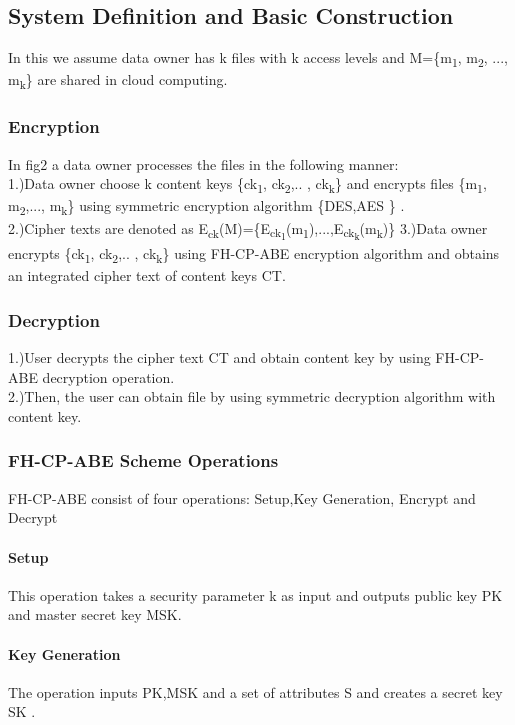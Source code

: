 \documentclass[a4paper,12pt]{article}
\begin{document}
\subsection{System Definition and Basic Construction}
In this we assume data owner has k files with k access levels and M=\{m\textsubscript{1}, m\textsubscript{2}, ..., m\textsubscript{k}\} are shared in cloud computing.\\ 
\subsubsection{Encryption}
In fig2 a data owner processes the files in the following manner:\\ 
1.)Data owner choose k content keys \{ck\textsubscript{1}, ck\textsubscript{2},.. , ck\textsubscript{k}\} and encrypts files \{m\textsubscript{1}, m\textsubscript{2},..., m\textsubscript{k}\} using symmetric encryption algorithm \{DES,AES \} .\\
2.)Cipher texts are denoted as E\textsubscript{ck}(M)=\{E\textsubscript{ck\textsubscript{1}}(m\textsubscript{1}),...,E\textsubscript{ck\textsubscript{k}}(m\textsubscript{k})\}
3.)Data owner encrypts \{ck\textsubscript{1}, ck\textsubscript{2},.. , ck\textsubscript{k}\} using FH-CP-ABE encryption algorithm and obtains an integrated cipher text of content keys CT.
\subsubsection{Decryption}
1.)User decrypts the cipher text CT and obtain content key by using FH-CP-ABE decryption operation.\\
2.)Then, the user can obtain file by using symmetric decryption algorithm with content key.

\subsubsection{FH-CP-ABE Scheme Operations}
FH-CP-ABE consist of four operations: Setup,Key Generation, Encrypt and Decrypt
\paragraph{Setup}This operation takes a security parameter k as input and outputs public key PK and master secret key MSK.
\paragraph{Key Generation}The operation inputs PK,MSK and a set of attributes S and creates a secret key SK .
\end{document}
